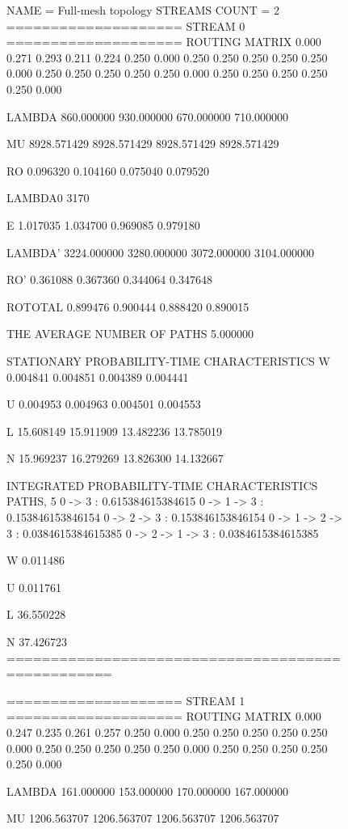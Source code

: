 \documentclass[oneside, draft, 14pt, a4paper]{extreport}
\begin{document}
\begin{figure}[h!]
	\begin{listing}{1}
NAME = Full-mesh topology
STREAMS COUNT = 2
==================== STREAM 0 ====================
ROUTING MATRIX
0.000	0.271	0.293	0.211	0.224
0.250	0.000	0.250	0.250	0.250
0.250	0.250	0.000	0.250	0.250
0.250	0.250	0.250	0.000	0.250
0.250	0.250	0.250	0.250	0.000

LAMBDA
860.000000
930.000000
670.000000
710.000000

MU
8928.571429
8928.571429
8928.571429
8928.571429

RO
0.096320
0.104160
0.075040
0.079520

LAMBDA0
3170

E
1.017035
1.034700
0.969085
0.979180

LAMBDA'
3224.000000
3280.000000
3072.000000
3104.000000\end{listing}

	\label{pic:demo4_log_begin}
\end{figure}

\begin{figure}[h!]
	\begin{listing}{43}
RO'
0.361088
0.367360
0.344064
0.347648

ROTOTAL
0.899476
0.900444
0.888420
0.890015

THE AVERAGE NUMBER OF PATHS
5.000000

STATIONARY PROBABILITY-TIME CHARACTERISTICS
W
0.004841
0.004851
0.004389
0.004441

U
0.004953
0.004963
0.004501
0.004553

L
15.608149
15.911909
13.482236
13.785019

N
15.969237
16.279269
13.826300
14.132667\end{listing}
\end{figure}

\begin{figure}[h!]
	\begin{listing}{82}
INTEGRATED PROBABILITY-TIME CHARACTERISTICS
PATHS, 5
0 -> 3 : 0.615384615384615
0 -> 1 -> 3 : 0.153846153846154
0 -> 2 -> 3 : 0.153846153846154
0 -> 1 -> 2 -> 3 : 0.0384615384615385
0 -> 2 -> 1 -> 3 : 0.0384615384615385

W
0.011486

U
0.011761

L
36.550228

N
37.426723
==================================================

==================== STREAM 1 ====================
ROUTING MATRIX
0.000	0.247	0.235	0.261	0.257
0.250	0.000	0.250	0.250	0.250
0.250	0.250	0.000	0.250	0.250
0.250	0.250	0.250	0.000	0.250
0.250	0.250	0.250	0.250	0.000

LAMBDA
161.000000
153.000000
170.000000
167.000000

MU
1206.563707
1206.563707
1206.563707
1206.563707\end{listing}
\end{figure}
\end{document}

